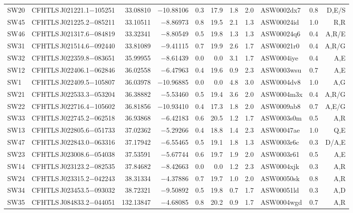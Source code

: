 \documentclass[useAMS,usenatbib,a4paper]{mn2e}
\begin{document}
\begin{center}
\begin{longtable}{llrrrrrrlrr}
SW20 & CFHTLS\,J021221.1$-$105251 &  33.08810 & $-$10.88106 &  0.3 & 17.9 &  1.8 &  2.0 & ASW0002dx7 &  0.8 &  D,E/S   \\ 
SW45 & CFHTLS\,J021225.2$-$085211 &  33.10511 &  $-$8.86973 &  0.8 & 19.5 &  2.1 &  1.3 & ASW00024id &  1.0 &  R,R   \\ 
SW46 & CFHTLS\,J021317.6$-$084819 &  33.32341 &  $-$8.80549 &  0.5 & 19.8 &  1.3 &  1.3 & ASW00024q6 &  0.4 &  A,R/E   \\ 
SW31 & CFHTLS\,J021514.6$-$092440 &  33.81089 &  $-$9.41115 &  0.7 & 19.9 &  2.6 &  1.7 & ASW00021r0 &  0.4 &  A,R/G   \\ 
SW32 & CFHTLS\,J022359.8$-$083651 &  35.99955 &  $-$8.61439 &  0.0 &  0.0 &  3.1 &  1.7 & ASW0004iye &  0.4 &  A,E   \\ 
SW12 & CFHTLS\,J022406.1$-$062846 &  36.02558 &  $-$6.47963 &  0.4 & 19.6 &  0.9 &  2.3 & ASW0003wsu &  0.7 &  A,E   \\ 
SW1  & CFHTLS\,J022409.5$-$105807 &  36.03978 & $-$10.96885 &  0.0 &  0.0 &  4.8 &  3.0 & ASW0004dv8 &  1.0 &  A,G   \\ 
SW21 & CFHTLS\,J022533.3$-$053204 &  36.38882 &  $-$5.53460 &  0.5 & 19.4 &  3.6 &  2.0 & ASW0004m3x &  0.4 &  A,R/G   \\ 
SW22 & CFHTLS\,J022716.4$-$105602 &  36.81856 & $-$10.93410 &  0.4 & 17.3 &  1.8 &  2.0 & ASW0009ab8 &  0.7 &  A,E/G   \\ 
SW33 & CFHTLS\,J022745.2$-$062518 &  36.93868 &  $-$6.42183 &  0.6 & 20.5 &  1.2 &  1.7 & ASW0003s0m &  0.5 &  A,R   \\ 
SW13 & CFHTLS\,J022805.6$-$051733 &  37.02362 &  $-$5.29266 &  0.4 & 18.8 &  1.4 &  2.3 & ASW00047ae &  1.0 &  Q,E   \\ 
SW47 & CFHTLS\,J022843.0$-$063316 &  37.17942 &  $-$6.55465 &  0.5 & 19.1 &  1.8 &  1.3 & ASW0003r6c &  0.3 &  D/A,E   \\ 
SW23 & CFHTLS\,J023008.6$-$054038 &  37.53591 &  $-$5.67744 &  0.6 & 19.7 &  1.9 &  2.0 & ASW0003r61 &  0.5 &  A,E   \\ 
SW14 & CFHTLS\,J023123.2$-$082535 &  37.84682 &  $-$8.42663 &  0.0 &  0.0 &  1.2 &  2.3 & ASW0004xjk &  0.3 &  A,R   \\ 
SW24 & CFHTLS\,J023315.2$-$042243 &  38.31334 &  $-$4.37886 &  0.7 & 19.7 &  1.0 &  2.0 & ASW00050sk &  0.8 &  A,R   \\ 
SW34 & CFHTLS\,J023453.5$-$093032 &  38.72321 &  $-$9.50892 &  0.5 & 19.8 &  0.7 &  1.7 & ASW00051ld &  0.3 &  A,D   \\ 
SW35 & CFHTLS\,J084833.2$-$044051 & 132.13847 &  $-$4.68085 &  0.8 & 20.2 &  0.9 &  1.7 & ASW0004wgd &  0.7 &  A,R   \\ 

\end{longtable}
\end{center}
\end{document}
